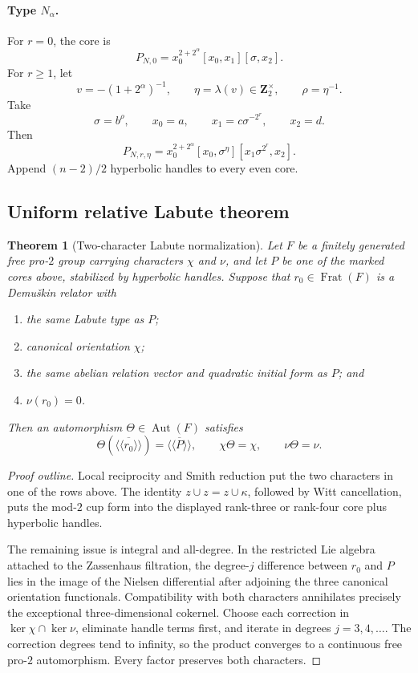 \documentclass[11pt,reqno]{amsart}
\newtheorem{theorem}{Theorem}[section]
\theoremstyle{definition}
\theoremstyle{remark}
\numberwithin{equation}{section}
\newcommand{\Z}{\mathbf Z}
\newcommand{\Aut}{\operatorname{Aut}}
\newcommand{\Frat}{\operatorname{Frat}}
\begin{document}
\paragraph{Type \(N_\alpha\).}
For \(r=0\), the core is
\begin{equation}\label{eq:Ncompact-core}
 P_{N,0}=x_0^{2+2^\alpha}[x_0,x_1][\sigma,x_2].
\end{equation}
For \(r\ge1\), let
\[
 v=-(1+2^\alpha)^{-1},\qquad
 \eta=\lambda(v)\in\Z_2^\times,\qquad \rho=\eta^{-1}.
\]
Take
\[
 \sigma=b^\rho,\qquad x_0=a,\qquad
 x_1=c\sigma^{-2^r},\qquad x_2=d.
\]
Then
\begin{equation}\label{eq:Npc-core}
 P_{N,r,\eta}
 =x_0^{2+2^\alpha}[x_0,\sigma^\eta]
  [x_1\sigma^{2^r},x_2].
\end{equation}
Append \((n-2)/2\) hyperbolic handles to every even core.

\subsection{Uniform relative Labute theorem}

\begin{theorem}[Two-character Labute normalization]\label{thm:labute}
Let \(F\) be a finitely generated free pro-\(2\) group carrying
characters \(\chi\) and \(\nu\), and let \(P\) be one of the marked cores
above, stabilized by hyperbolic handles.  Suppose that \(r_0\in\Frat(F)\)
is a Demu\v{s}kin relator with
\begin{enumerate}
\item the same Labute type as \(P\);
\item canonical orientation \(\chi\);
\item the same abelian relation vector and quadratic initial form as
\(P\); and
\item \(\nu(r_0)=0\).
\end{enumerate}
Then an automorphism \(\Theta\in\Aut(F)\) satisfies
\[
 \Theta\!\left(\overline{\langle\!\langle r_0\rangle\!\rangle}\right)
 =\overline{\langle\!\langle P\rangle\!\rangle},\qquad
 \chi\Theta=\chi,\qquad \nu\Theta=\nu.
\]
\end{theorem}

\begin{proof}[Proof outline]
Local reciprocity and Smith reduction put the two characters in one of
the rows above.  The identity \(z\cup z=z\cup\kappa\), followed by Witt
cancellation, puts the mod-\(2\) cup form into the displayed rank-three
or rank-four core plus hyperbolic handles.

The remaining issue is integral and all-degree.  In the restricted Lie
algebra attached to the Zassenhaus filtration, the degree-\(j\)
difference between \(r_0\) and \(P\) lies in the image of the Nielsen
differential after adjoining the three canonical orientation
functionals.  Compatibility with both characters annihilates precisely
the exceptional three-dimensional cokernel.  Choose each correction in
\(\ker\chi\cap\ker\nu\), eliminate handle terms first, and iterate in
degrees \(j=3,4,\ldots\).  The correction degrees tend to infinity, so
the product converges to a continuous free pro-\(2\) automorphism.  Every
factor preserves both characters.
\end{proof}
\end{document}
